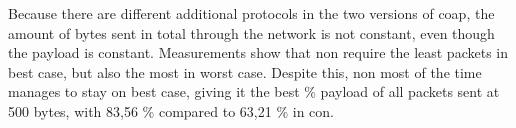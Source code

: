 \noindent Because there are different additional protocols in the two versions of \gls{coap}, the amount of bytes sent in total through the network is not constant, even though the \gls{payload} is constant. Measurements show that \gls{non} require the least packets in best case, but also the most in worst case. Despite this, \gls{non} most of the time manages to stay on best case, giving it the best \% payload of all packets sent at 500 bytes, with 83,56 \% compared to 63,21 \% in \gls{con}.   


